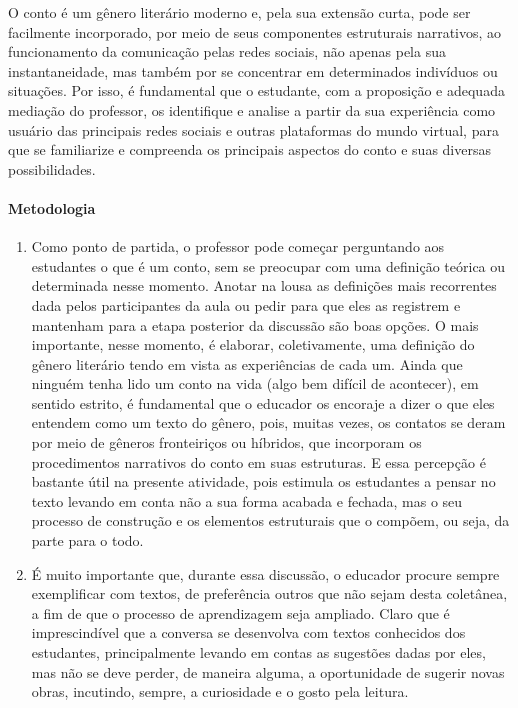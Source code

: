 \documentclass[12pt]{extarticle}
\begin{document}
O conto é um gênero literário moderno e, pela sua extensão curta, pode
ser facilmente incorporado, por meio de seus componentes estruturais
narrativos, ao funcionamento da comunicação pelas redes sociais, não
apenas pela sua instantaneidade, mas também por se concentrar em
determinados indivíduos ou situações. Por isso, é fundamental que o
estudante, com a proposição e adequada mediação do professor, os
identifique e analise a partir da sua experiência como usuário das
principais redes sociais e outras plataformas do mundo virtual, para que
se familiarize e compreenda os principais aspectos do conto e suas
diversas possibilidades.

\paragraph{Metodologia}
\begin{enumerate}
\item
Como ponto de partida, o professor pode começar
perguntando aos estudantes o que é um conto, sem se preocupar com uma
definição teórica ou determinada nesse momento. Anotar na lousa as
definições mais recorrentes dada pelos participantes da aula ou pedir
para que eles as registrem e mantenham para a etapa posterior da
discussão são boas opções. O mais importante, nesse momento, é elaborar,
coletivamente, uma definição do gênero literário tendo em vista as
experiências de cada um. Ainda que ninguém tenha lido um conto na vida
(algo bem difícil de acontecer), em sentido estrito, é fundamental que o
educador os encoraje a dizer o que eles entendem como um texto do
gênero, pois, muitas vezes, os contatos se deram por meio de gêneros
fronteiriços ou híbridos, que incorporam os procedimentos narrativos do
conto em suas estruturas. E essa percepção é bastante útil na presente
atividade, pois estimula os estudantes a pensar no texto levando em
conta não a sua forma acabada e fechada, mas o seu processo de
construção e os elementos estruturais que o compõem, ou seja, da parte
para o todo.

\item
É muito importante que, durante essa discussão, o educador procure
sempre exemplificar com textos, de preferência outros que não sejam
desta coletânea, a fim de que o processo de aprendizagem seja ampliado.
Claro que é imprescindível que a conversa se desenvolva com textos
conhecidos dos estudantes, principalmente levando em contas as sugestões
dadas por eles, mas não se deve perder, de maneira alguma, a
oportunidade de sugerir novas obras, incutindo, sempre, a curiosidade e
o gosto pela leitura.


\end{enumerate}
\end{document}
